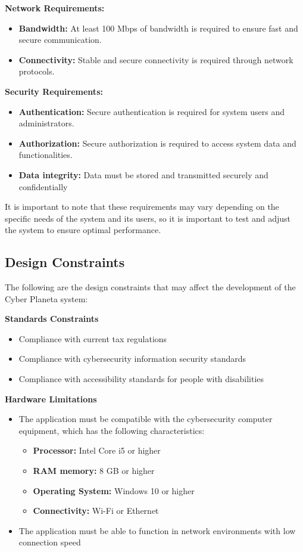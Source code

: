 \documentclass[12pt,a4paper, twosite]{article}
\begin{document}
\textbf{Network Requirements:}
\begin{itemize}
     \item \textbf {Bandwidth:} At least 100 Mbps of bandwidth is required to ensure fast and secure communication.
     \item \textbf {Connectivity:}  Stable and secure connectivity is required through network protocols.
\end{itemize}
\textbf{Security Requirements:}
\begin{itemize}
    \item \textbf {Authentication:} Secure authentication is required for system users and administrators.
    \item \textbf {Authorization:} Secure authorization is required to access system data and functionalities.
    \item \textbf {Data integrity:} Data must be stored and transmitted securely and confidentially
\end{itemize}

It is important to note that these requirements may vary depending on the specific needs of the system and its users, so it is important to test and adjust the system to ensure optimal performance.



\subsection{Design Constraints}
\label{sec:org49fe900}

The following are the design constraints that may affect the development of the Cyber Planeta system:

\textbf{Standards Constraints}
\begin{itemize}
    \item Compliance with current tax regulations
    \item Compliance with cybersecurity information security standards
    \item Compliance with accessibility standards for people with disabilities
\end{itemize}

\textbf{Hardware Limitations}
\begin{itemize}
    \item The application must be compatible with the cybersecurity computer equipment, which has the following characteristics:
    \begin{itemize}
        \item \textbf{Processor:} Intel Core i5 or higher
        \item \textbf{RAM memory:} 8 GB or higher
        \item \textbf{Operating System:} Windows 10 or higher
        \item \textbf{Connectivity:} Wi-Fi or Ethernet
    \end{itemize}
    
    \item The application must be able to function in network environments with low connection speed
\end{itemize}
\end{document}

